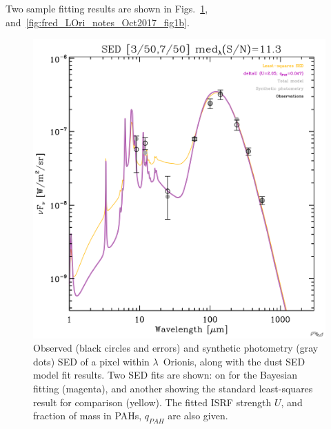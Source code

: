           Two sample fitting results are shown in Figs.~\ref{fig:fred_LOri_notes_Oct2017_fig1a}, and~\ref{fig:fred_LOri_notes_Oct2017_fig1b}.
              \begin{figure}
                \includegraphics[width=\textwidth]{../Plots/ch_lori/fred_LOri_notes_Oct2017_fig1a.pdf}
                \centering
                \caption{Observed (black circles and errors) and synthetic photometry (gray dots) SED of a pixel within $\lambda$~Orionis, along with the dust SED model fit results. Two SED fits are shown: on for the Bayesian fitting (magenta), and another showing the standard least-squares result for comparison (yellow). The fitted ISRF strength $U$, and fraction of mass in PAHs, $q_{PAH}$ are also given.}
                \label{fig:fred_LOri_notes_Oct2017_fig1a}
              \end{figure}

